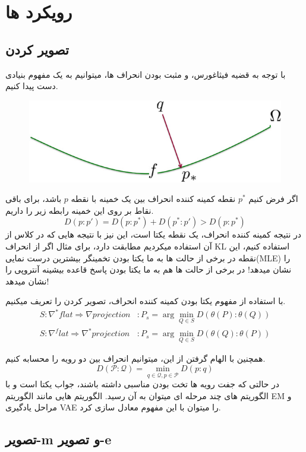 \section{رویکرد ها}

\subsection{تصویر کردن}

با توجه به قضیه فیثاغورس، و مثبت بودن انحراف ها، میتوانیم به یک مفهوم بنیادی دست پیدا کنیم.

\begin{figure}[h]
	\centering
	\includegraphics*[width=0.5\linewidth]{Pictures/Q5/information-proj.png}
\end{figure}

اگر فرض کنیم $p^*$ نقطه کمینه کننده انحراف بین یک خمینه  با نقطه $p$ باشد، برای باقی نقاط بر روی این خمینه رابطه زیر را داریم.
$$D(p:p')=D(p:p^*)+D(p^*:p')>D(p:p^*)$$
در نتیجه کمینه کننده انحراف، یک نقطه یکتا است، این نیز با نتیجه هایی که در کلاس از آن استفاده میکردیم مطابقت دارد، برای مثال اگر از انحراف KL استفاده کنیم،
این نقطه در برخی از حالت ها به ما یکتا بودن تخمینگر بیشترین درست نمایی(MLE) را نشان میدهد! در برخی از حالت ها هم به ما یکتا بودن پاسخ قاعده بیشینه آنتروپی را نشان میدهد!

با استفاده از مفهوم یکتا بودن کمینه کننده انحراف، تصویر کردن را تعریف میکنیم.
\begin{align*}
	S: \nabla^*flat  \Rightarrow \nabla projection   & : P_s=\arg\min_{Q\in S}D(\theta(P):\theta(Q)) \\
	S: \nabla^flat   \Rightarrow \nabla^* projection & : P_s=\arg\min_{Q\in S}D(\theta(Q):\theta(P))
\end{align*}

همچنین با الهام گرفتن از این، میتوانیم انحراف بین دو رویه را محسابه کنیم.
$$D(\mathcal{P}:\mathcal{Q})=\min_{q\in \mathcal{Q}, p\in \mathcal{P}}D(p:q)$$
در حالتی که جفت رویه ها تخت بودن مناسبی داشته باشند، جواب یکتا است و با الگوریتم های چند مرحله ای میتوان به آن رسید. الگوریتم هایی مانند الگوریتم EM و مراحل یادگیری VAE را میتوان با این مفهوم معادل سازی کرد.

\clearpage

\subsection{تصویر-m و تصویر-e}

